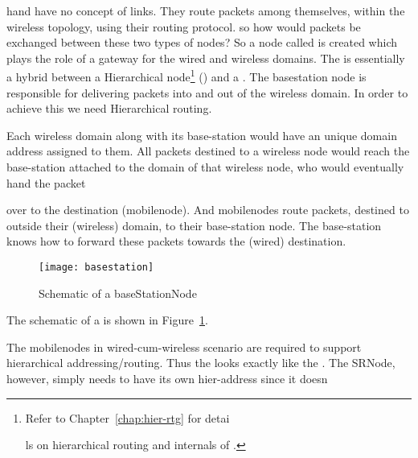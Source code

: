 {hand have no concept of links. They route packets among themselves, within the wireless topology, using their routing protocol. so how would packets be exchanged between these two types of nodes?
So a node called  is created which plays the role of a gateway for the wired and wireless domains. The  is essentially a hybrid between a Hierarchical node\footnote{Refer to Chapter~\ref{chap:hier-rtg} for detai











ls on hierarchical routing and internals of .} () and a . The basestation node is responsible for delivering packets into and out of the wireless domain. In order to achieve this we need Hierarchical routing.











 Each wireless domain along with its base-station would have an unique domain address assigned to them. All packets destined to a wireless node would reach the base-station attached to the domain of that wireless node, who would eventually hand the packet











 over to the destination (mobilenode). And mobilenodes route packets, destined to outside their (wireless) domain, to their base-station node. The base-station knows how to forward these packets towards the (wired) destination. 
\begin{figure}
    \centerline{\texttt{[image: basestation]}}
    \caption{Schematic of a baseStationNode}
    \label{fig:mobilenode-basestation}
\end{figure}
The schematic of a  is shown in Figure~\ref{fig:mobilenode-basestation}.

The mobilenodes in wired-cum-wireless scenario are required to support hierarchical addressing/routing. Thus the  looks exactly like the . The SRNode, however, simply needs to have its own hier-address since it doesn











}
